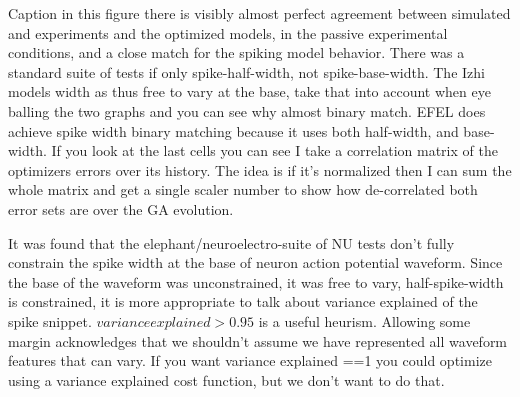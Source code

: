 Caption in this figure there is visibly almost perfect  agreement between simulated and experiments and the optimized models, in the passive experimental conditions, and a close match for the spiking model behavior. There was a standard suite of tests if only spike-half-width, not spike-base-width. The Izhi models width as thus free to vary at the base, take that into account when eye balling the two graphs and you can see why almost binary match. EFEL does achieve spike width binary matching because it uses both half-width, and base-width. If you look at the last cells you can see I take a correlation matrix of the optimizers errors over its history. The idea is if it's normalized then I can sum the whole matrix and get a single scaler number to show how de-correlated both error sets are over the GA evolution. 

It was found that the elephant/neuroelectro-suite of NU tests don't fully constrain the spike width at the base of neuron action potential waveform. Since the base of the waveform was unconstrained, it was free to vary, half-spike-width is constrained, it is more appropriate to talk about variance explained of the spike snippet. $variance explained>0.95$ is a useful heurism. Allowing some margin acknowledges that we shouldn't assume we have represented all waveform features that can vary. If you want variance explained ==1   you could optimize using a variance explained cost function, but we don't want to do that.